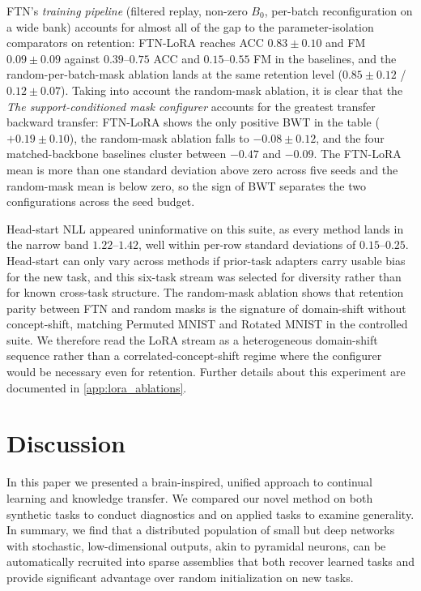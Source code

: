 \documentclass{article}
\begin{document}
FTN's \emph{training pipeline} (filtered replay, non-zero $B_0$, per-batch reconfiguration on a wide bank) accounts for almost all of the gap to the parameter-isolation comparators on retention: FTN-LoRA reaches ACC $0.83\pm0.10$ and FM $0.09\pm0.09$ against $0.39$--$0.75$ ACC and $0.15$--$0.55$ FM in the baselines, and the random-per-batch-mask ablation lands at the same retention level ($0.85\pm0.12$ / $0.12\pm0.07$). Taking into account the random-mask ablation, it is clear that the \emph{The support-conditioned mask configurer} accounts for the greatest transfer backward transfer: FTN-LoRA shows the only positive BWT in the table ($+0.19\pm0.10$), the random-mask ablation falls to $-0.08\pm0.12$, and the four matched-backbone baselines cluster between $-0.47$ and $-0.09$. The FTN-LoRA mean is more than one standard deviation above zero across five seeds and the random-mask mean is below zero, so the sign of BWT separates the two configurations across the seed budget. 

Head-start NLL appeared uninformative on this suite, as every method lands in the narrow band $1.22$--$1.42$, well within per-row standard deviations of $0.15$--$0.25$. Head-start can only vary across methods if prior-task adapters carry usable bias for the new task, and this six-task stream was selected for diversity rather than for known cross-task structure. The random-mask ablation shows that retention parity between FTN and random masks is the signature of domain-shift without concept-shift, matching Permuted MNIST and Rotated MNIST in the controlled suite. We therefore read the LoRA stream as a heterogeneous domain-shift sequence rather than a correlated-concept-shift regime where the configurer would be necessary even for retention. Further details about this experiment are documented in \cref{app:lora_ablations}.

\section{Discussion}\label{sec:discussion}
In this paper we presented a brain-inspired, unified approach to continual learning and knowledge transfer. We compared our novel method on both synthetic tasks to conduct diagnostics and on applied tasks to examine generality. In summary, we find that a distributed population of small but deep networks with stochastic, low-dimensional outputs, akin to pyramidal neurons, can be automatically recruited into sparse assemblies that both recover learned tasks and provide significant advantage over random initialization on new tasks.
\end{document}
